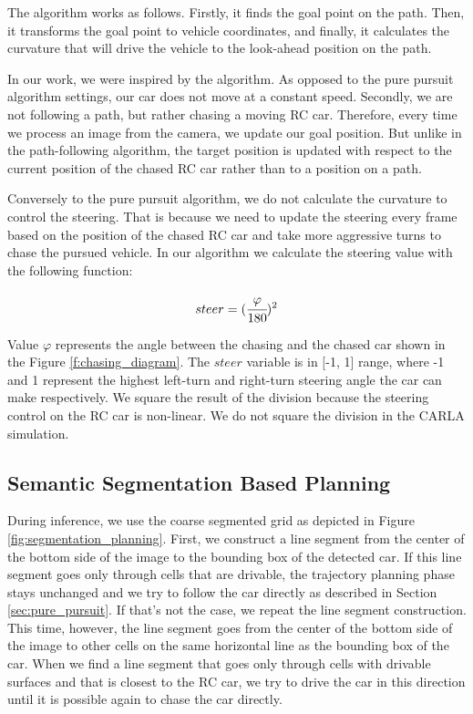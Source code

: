 \documentclass{ctuthesis/ctuthesis}
\begin{document}
The algorithm works as follows. Firstly, it finds the goal point on the path. Then, it transforms the goal point to vehicle coordinates, and finally, it calculates the curvature that will drive the vehicle to the look-ahead position on the path. \par


In our work, we were inspired by the algorithm. As opposed to the pure pursuit algorithm settings, our car does not move at a constant speed. Secondly, we are not following a path, but rather chasing a moving RC car. Therefore, every time we process an image from the camera, we update our goal position. But unlike in the path-following algorithm, the target position is updated with respect to the current position of the chased RC car rather than to a position on a path. \par
Conversely to the pure pursuit algorithm, we do not calculate the curvature to control the steering. That is because we need to update the steering every frame based on the position of the chased RC car and take more aggressive turns to chase the pursued vehicle. In our algorithm we calculate the steering value with the following function:

\begin{equation}steer = (\cfrac{\varphi}{\textrm{180}})^{2}\end{equation}

Value $\varphi$ represents the angle between the chasing and the chased car shown in the Figure \ref{f:chasing_diagram}. The $steer$ variable is in [-1, 1] range, where -1 and 1 represent the highest left-turn and right-turn steering angle the car can make respectively. We square the result of the division because the steering control on the RC car is non-linear. We do not square the division in the CARLA simulation.




\subsection{Semantic Segmentation Based Planning}
During inference, we use the coarse segmented grid as depicted in Figure \ref{fig:segmentation_planning}. First, we construct a line segment from the center of the bottom side of the image to the bounding box of the detected car. If this line segment goes only through cells that are drivable, the trajectory planning phase stays unchanged and we try to follow the car directly as described in Section \ref{sec:pure_pursuit}. If that's not the case, we repeat the line segment construction. This time, however, the line segment goes from the center of the bottom side of the image to other cells on the same horizontal line as the bounding box of the car. When we find a line segment that goes only through cells with drivable surfaces and that is closest to the RC car, we try to drive the car in this direction until it is possible again to chase the car directly.
\end{document}
